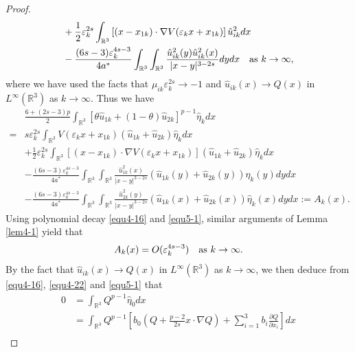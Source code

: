 \documentclass[10pt,a4paper]{amsart}
\begin{document}
\begin{proof}
\begin{align*}
			&+\frac{1}{2}\varepsilon_{k}^{2s}\int_{\mathbb{R}^{3}}\left[ (x-x_{1k})\cdot \nabla V(\varepsilon_{k}x+x_{1k})\right] \hat{u}_{ik}^{2}dx\\
			&-\frac{(6s-3)\varepsilon_{k}^{4s-3}}{4a^{\ast}}\int_{\mathbb{R}^{3}}\int_{\mathbb{R}^{3}}\frac{\hat{u}_{ik}^{2}(y)\hat{u}_{ik}^{2}(x)}{|x-y|^{3-2s}}dydx \quad \hbox{as $k\rightarrow\infty$},
		\end{align*}
		where we have used the facts that $\mu_{ik}\varepsilon^{2s}_{k}\rightarrow-1$ and $\hat{u}_{ik}(x)\rightarrow Q(x)$ in $L^{\infty}(\mathbb{R}^{3})$
		as $k\rightarrow\infty$. Thus we have
		\begin{equation*}
			\begin{split}
				&\frac{6+(2s-3)p}{2}\int_{\mathbb{R}^{3}}\left[\theta \hat{u}_{1k}+(1-\theta)\hat{u}_{2k}\right]^{p-1}\hat{\eta}_{k}dx\\
				=&s\varepsilon_{k}^{2s}\int_{\mathbb{R}^{3}}V(\varepsilon_{k}x+x_{1k})(\hat{u}_{1k}+\hat{u}_{2k})\hat{\eta}_{k}dx\\
				&+\frac{1}{2}\varepsilon_{k}^{2s}\int_{\mathbb{R}^{3}}\left[ (x-x_{1k})\cdot \nabla V(\varepsilon_{k}x+x_{1k})\right](\hat{u}_{1k}+\hat{u}_{2k})\hat{\eta}_{k}dx\\
				&-\frac{(6s-3)\varepsilon_{k}^{4s-3}}{4a^{\ast}}\int_{\mathbb{R}^{3}}\int_{\mathbb{R}^{3}}\frac{\hat{u}_{1k}^{2}(x)}{|x-y|^{3-2s}}(\hat{u}_{1k}(y)+\hat{u}_{2k}(y))\hat{\eta}_{k}(y)dydx\\
				&-\frac{(6s-3)\varepsilon_{k}^{4s-3}}{4a^{\ast}}\int_{\mathbb{R}^{3}}\int_{\mathbb{R}^{3}}\frac{\hat{u}_{2k}^{2}(y)}{|x-y|^{3-2s}}(\hat{u}_{1k}(x)+\hat{u}_{2k}(x))\hat{\eta}_{k}(x)dydx:=A_{k}(x).
			\end{split}
		\end{equation*}
		Using polynomial decay \eqref{equ4-16} and \eqref{equ5-1}, similar arguments of Lemma \ref{lem4-1} yield that
		\begin{equation*}
			A_{k}(x)=O(\varepsilon_{k}^{4s-3})\quad \hbox{as $k\rightarrow\infty$}.
		\end{equation*}
		By the fact that $\hat{u}_{ik}(x)\rightarrow Q(x)$ in $L^{\infty}(\mathbb{R}^{3})$ as $k\rightarrow\infty$, we then deduce from \eqref{equ4-16}, \eqref{equ4-22} and \eqref{equ5-1} that
		\begin{equation*}
			\begin{split}
				0&=\int_{\mathbb{R}^{3}}Q^{p-1}\hat{\eta}_{0}dx\\
				&=\int_{\mathbb{R}^{3}}Q^{p-1}\left[ b_{0}\left(Q+\frac{p-2}{2s}x\cdot\nabla Q\right)+\sum_{i=1}^{3}b_{i}\frac{\partial Q}{\partial x_{i}}\right] dx\\

\end{split}
\end{equation*}
\end{proof}
\end{document}
